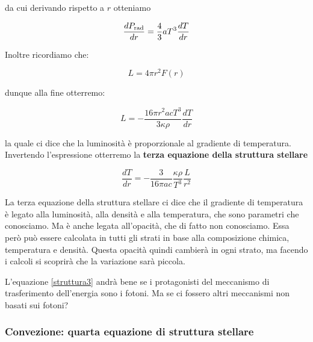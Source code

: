 da cui derivando rispetto a $r$ otteniamo

$$\frac{dP_{\rm rad}}{dr}=\frac{4}{3} a T^3\frac{dT}{dr}$$

Inoltre ricordiamo che:

$$L=4\pi r^2 F(r)$$

dunque alla fine otterremo:

$$L=-\frac{16\pi r^2acT^3}{3\kappa \rho}\frac{dT}{dr}$$

la quale ci dice che la luminosità è proporzionale al gradiente di temperatura. Invertendo l'espressione otterremo la \textbf{terza equazione della struttura stellare}

\begin{equation}
    \frac{dT}{dr}=-\frac{3}{16 \pi ac}\frac{\kappa \rho}{T^3}\frac{L}{r^2}
    \label{struttura3}
\end{equation}

La terza equazione della struttura stellare ci dice che il gradiente di temperatura è legato alla luminosità, alla densità e alla temperatura, che sono parametri che conosciamo. Ma è anche legata all'opacità, che di fatto non conosciamo. Essa però può essere calcolata in tutti gli strati in base alla composizione chimica, temperatura e densità. Questa opacità quindi cambierà in ogni strato, ma facendo i calcoli si scoprirà che la variazione sarà piccola.

\vspace{0.2cm}L'equazione \ref{struttura3} andrà bene se i protagonisti del meccanismo di trasferimento dell'energia sono i fotoni. Ma se ci fossero altri meccanismi non basati sui fotoni?

\subsubsection{Convezione: quarta equazione di struttura stellare}

